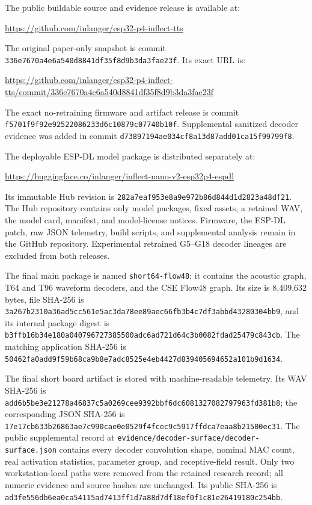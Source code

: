 \documentclass[10pt]{article}
\begin{document}
The public buildable source and evidence release is available at:
\begin{center}
\small\url{https://github.com/inlanger/esp32-p4-inflect-tts}
\end{center}
The original paper-only snapshot is commit
\nolinkurl{336e7670a4e6a540d8841df35f8d9b3da3fae23f}. Its exact URL is:
\begin{center}
\small\url{https://github.com/inlanger/esp32-p4-inflect-tts/commit/336e7670a4e6a540d8841df35f8d9b3da3fae23f}
\end{center}
The exact no-retraining firmware and artifact release is commit
\nolinkurl{f5701f9f92e92522086233d6c10879c07740b10f}. Supplemental sanitized
decoder evidence was added in commit
\nolinkurl{d73897194ae034cf8a13d87add01ca15f99799f8}.

The deployable ESP-DL model package is distributed separately at:
\begin{center}
\small\url{https://huggingface.co/inlanger/inflect-nano-v2-esp32p4-espdl}
\end{center}
Its immutable Hub revision is
\nolinkurl{282a7eaf953e8a9e972b86d844d1d2823a48df21}. The Hub repository contains
only model packages, fixed assets, a retained WAV, the model card, manifest,
and model-license notices. Firmware, the ESP-DL patch, raw JSON telemetry,
build scripts, and supplemental analysis remain in the GitHub repository.
Experimental retrained G5--G18 decoder lineages are excluded from both
releases.

The final main package is named \texttt{short64-flow48}; it contains the
acoustic graph, T64 and T96 waveform decoders, and the CSE Flow48 graph. Its size is
8,409,632 bytes, file SHA-256 is
\nolinkurl{3a267b2310a36ad5cc561e5ac3da78ee89aec66fb3b4c7df3abbd43280304bb9},
and its internal package digest is
\nolinkurl{b3ffb16b34e180a040796727385500adc6ad721d64c3b0082fdad25479c843cb}.
The matching application SHA-256 is
\nolinkurl{50462fa0add9f59b68ca9b8e7adc8525e4eb4427d839405694652a101b9d1634}.

The final short board artifact is stored with machine-readable telemetry. Its
WAV SHA-256 is
\nolinkurl{add6b5be3e21278a46837c5a0269cee9392bbf6dc6081327082797963fd381b8};
the corresponding JSON SHA-256 is
\nolinkurl{17e17cb633b26863ae7c990cae0e0529f4fcec9c5917ffdca7eaa8b21500ec31}.
The public supplemental record at
\nolinkurl{evidence/decoder-surface/decoder-surface.json} contains every
decoder convolution shape, nominal MAC count, real activation statistics,
parameter group, and receptive-field result. Only two workstation-local paths
were removed from the retained research record; all numeric evidence and
source hashes are unchanged. Its public SHA-256 is
\nolinkurl{ad3fe556db6ea0ca54115ad7413ff1d7a88d7df18ef0f1c81e26419180c254bb}.
\end{document}
